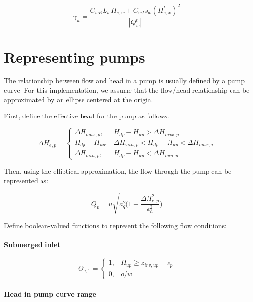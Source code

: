 \documentclass[11pt]{article}
\begin{document}
\begin{equation}
 \gamma_w = \frac{C_{wR} L_{w} H_{e,w} + C_{wT} s_{w} (H_{e,w}^{t})^2}{|Q_{w}^t|}
\end{equation}

\section{Representing pumps}

The relationship between flow and head in a pump is usually defined by a pump
curve. For this implementation, we assume that the flow/head relationship can be
approximated by an ellipse centered at the origin.

First, define the effective head for the pump as follows:

\begin{equation}
  \Delta H_{e,p} =
  \begin{cases}
    \Delta H_{max,p}, & H_{dp} - H_{up} > \Delta H_{max,p} \\
    H_{dp} - H_{up}, & \Delta H_{min,p} < H_{dp} - H_{up} < \Delta H_{max,p} \\
    \Delta H_{min,p}, & H_{dp} - H_{up} < \Delta H_{min,p}
  \end{cases}
\end{equation}

Then, using the elliptical approximation, the flow through the pump can be
represented as:

\begin{equation}
 Q_p = u \sqrt{a_q^2 \bigl( 1 - \frac{\Delta H_{e,p}^2}{a_h^2} \bigr)} 
\end{equation}

Define boolean-valued functions to represent the following flow conditions:

\paragraph{Submerged inlet}

\begin{equation}
  \Theta_{p,1} =
  \begin{cases}
    1, & H_{up} \geq z_{inv,up} + z_p  \\
    0, & o/w
  \end{cases}
\end{equation}

\paragraph{Head in pump curve range}
\end{document}
